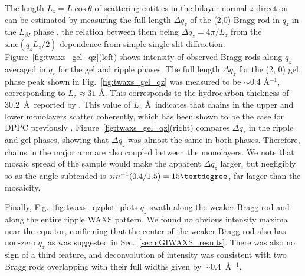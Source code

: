 The length $L_z=L\cos\theta$ of scattering entities in the bilayer normal $z$ direction can be estimated by 
measuring the full length $\Delta q_z$ of the (2,0) Bragg rod in $q_z$ in
the $L_{\beta I}$ phase \cite{ref:Tristram93},
the relation between them being $\Delta q_z = 4\pi/L_z$ 
from the $\textrm{sinc}(q_zL_z/2)$ dependence from simple single slit 
diffraction. 
Figure~\ref{fig:twaxs_gel_qz}(left) shows intensity of observed Bragg rods along $q_z$ averaged in $q_r$
for the gel and ripple phases. The full length $\Delta q_z$ for the (2, 0) gel
phase peak shown in Fig.~\ref{fig:twaxs_gel_qz} was measured to be 
$\sim$0.4 \AA$^{-1}$, corresponding to 
$L_z \approx 31$ \AA. 
This corresponds to the hydrocarbon thickness of 30.2~\AA\  
reported by \cite{Tristram-Nagle02}. 
This value of $L_z$ \AA\ indicates that chains in the upper and
lower monolayers scatter coherently, which has been shown to be the case
for DPPC previously \cite{ref:Tristram93}.
Figure~\ref{fig:twaxs_gel_qz}(right) compares $\Delta q_z$ in the ripple and gel phases,
showing that $\Delta q_z$ was almost the same in both phases. Therefore, 
chains in the major arm are also coupled between the monolayers. 
We note that mosaic spread of the sample would make the apparent $\Delta q_z$ 
larger, but negligibly so as the angle subtended is $sin^{-1}(0.4/1.5)=15\textdegree$, 
far larger than the mosaicity.

Finally, Fig.~\ref{fig:twaxs_qzplot} plots $q_z$ swath along the weaker 
Bragg rod and along the entire ripple WAXS pattern. 
We found no obvious intensity maxima
near the equator, confirming that the center of the weaker Bragg rod also 
has non-zero $q_z$ as was suggested in Sec.~\ref{sec:nGIWAXS_results}.
There was also no sign of a third feature, and deconvolution of intensity
was consistent with two Bragg rods overlapping 
with their full widths given by $\sim$0.4~\AA$^{-1}$.

